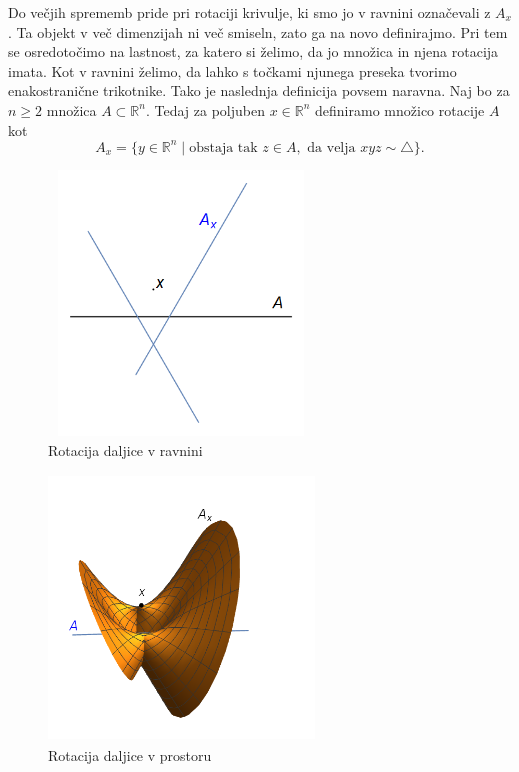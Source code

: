 \documentclass[mat1]{fmfdelo}
\newcommand{\R}{\mathbb R}
\begin{document}
Do večjih sprememb pride pri rotaciji krivulje, ki smo jo v ravnini označevali z $A_x$. Ta objekt v več dimenzijah ni več smiseln, zato ga na novo definirajmo. Pri tem se osredotočimo na lastnost, za katero si želimo, da jo množica in njena rotacija imata. Kot v ravnini želimo, da lahko s točkami njunega preseka tvorimo enakostranične trikotnike. Tako je naslednja definicija povsem naravna. Naj bo za $n \geq 2$ množica $A \subset \R^n$. Tedaj za poljuben $x \in \R^n$ definiramo množico rotacije $A$ kot 
\[ A_x = \{y \in \R^n \mid \text{obstaja tak } z \in A, \text{ da velja } xyz \sim \triangle \}. \]

\begin{figure}[h!]
\centering
\includegraphics[width = 200pt, height = 200pt]{rotacija_druga_ravnina.png}
\caption{Rotacija daljice v ravnini}
\label{fig:rotacija_sprem_ravnina}
\end{figure}

\begin{figure}[h!]
\centering
\includegraphics[width = 200pt, height = 200pt]{rotacija_druga_prostor.png}
\caption{Rotacija daljice v prostoru}
\label{fig:rotacija_sprem_prostor}
\end{figure}
\end{document}
